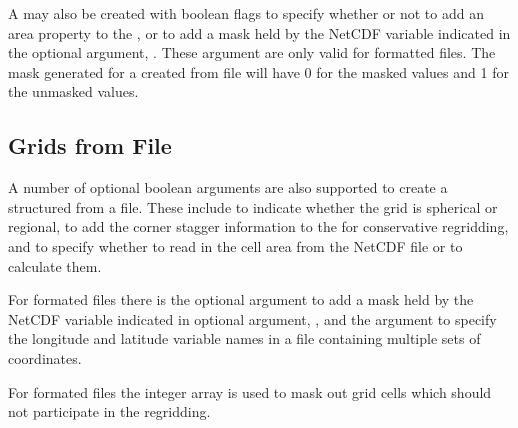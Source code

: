 \documentclass[letterpaper,10pt,english]{sphinxmanual}
\begin{document}
A {\hyperref[\detokenize{mesh:ESMF.api.mesh.Mesh}]{}} may also be created with boolean flags to specify whether or not to
add an area property to the {\hyperref[\detokenize{mesh:ESMF.api.mesh.Mesh}]{}} , or to add a mask
 held by the NetCDF variable indicated in the optional argument,
.  These argument are only valid for {\hyperref[\detokenize{FileFormat:ESMF.api.constants.FileFormat.UGRID}]{}} formatted files.
The mask generated for a {\hyperref[\detokenize{mesh:ESMF.api.mesh.Mesh}]{}} created from file will
have 0 for the masked values and 1 for the unmasked values.


\subsection{Grids from File}
\label{\detokenize{api:grids-from-file}}
A number of optional boolean arguments are also supported to create a
structured {\hyperref[\detokenize{grid:ESMF.api.grid.Grid}]{}} from a file.  These include  to indicate whether
the grid is spherical or regional,  to add the corner
stagger information to the {\hyperref[\detokenize{grid:ESMF.api.grid.Grid}]{}} for conservative regridding, and
 to specify whether to read in the cell area from the
NetCDF file or to calculate them.

For {\hyperref[\detokenize{FileFormat:ESMF.api.constants.FileFormat.GRIDSPEC}]{}} formated files
there is the  optional argument
to add a mask held by the NetCDF variable indicated in optional
argument, , and the  argument to specify the longitude
and latitude variable names in a {\hyperref[\detokenize{FileFormat:ESMF.api.constants.FileFormat.GRIDSPEC}]{}} file containing multiple sets of
coordinates.

For {\hyperref[\detokenize{FileFormat:ESMF.api.constants.FileFormat.SCRIP}]{}} formated files the integer array  is used to mask out grid cells which should not participate in the regridding.
\end{document}
